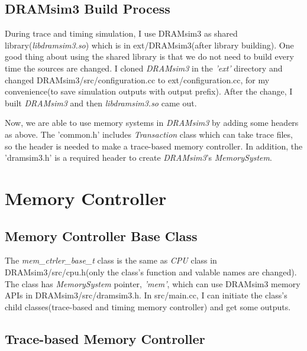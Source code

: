 \documentclass[conference]{IEEEtran}
\begin{document}
\subsection{DRAMsim3 Build Process}
During trace and timing simulation, I use DRAMsim3 as shared library(\emph{libdramsim3.so}) which is in ext/DRAMsim3(after library building).
One good thing about using the shared library is that we do not need to build every time the sources are changed. 
 I cloned \emph{DRAMsim3} in the \emph{'ext'} directory and changed DRAMsim3/src/configuration.cc to ext/configuration.cc, for my convenience(to save simulation outputs with output prefix).
After the change, I built \emph{DRAMsim3} and then \emph{libdramsim3.so} came out.



Now, we are able to use memory systems in \emph{DRAMsim3} by adding some headers as above.
The 'common.h' includes \emph{Transaction} class which can take trace files, so the header is needed to make a trace-based memory controller. 
In addition, the 'dramsim3.h' is a required header to create \emph{DRAMsim3}'s \emph{MemorySystem}. 

\section{Memory Controller} \label{sec:mem_ctrler}
\subsection{Memory Controller Base Class}


The \emph{mem\_ctrler\_base\_t} class is the same as \emph{CPU} class in DRAMsim3/src/cpu.h(only the class's function and valable names are changed). 
The class has \emph{MemorySystem} pointer, \emph{'mem'}, which can use DRAMsim3 memory APIs in DRAMsim3/src/dramsim3.h. 
In src/main.cc, I can initiate the class's child classes(trace-based and timing memory controller) and get some outputs.

\subsection{Trace-based Memory Controller}

\end{document}
